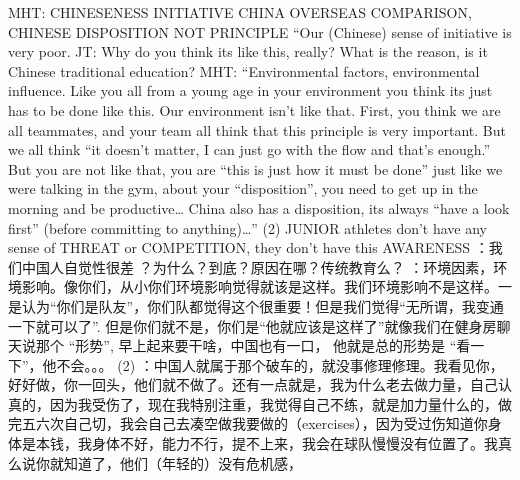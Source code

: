 \begin{CJK}{UTF8}{gbsn}


              MHT:
              CHINESENESS INITIATIVE CHINA OVERSEAS COMPARISON, CHINESE DISPOSITION NOT PRINCIPLE “Our (Chinese) sense of initiative is very poor.  JT: Why do you think its like this, really? What is the reason, is it Chinese traditional education? MHT: “Environmental factors, environmental influence.  Like you all from a young age in your environment you think its just has to be done like this.  Our environment isn’t like that.  First, you think we are all teammates, and your team all think that this principle is very important.  But we all think “it doesn’t matter, I can just go with the flow and that’s enough.” But you are not like that, you are “this is just how it must be done” just like we were talking in the gym, about your “disposition”, you need to get up in the morning and be productive… China also has a disposition, its always “have a look first” (before committing to anything)…” (2) JUNIOR athletes don’t have any sense of THREAT or COMPETITION, they don’t have this AWARENESS	：我们中国人自觉性很差
              ？为什么？到底？原因在哪？传统教育么？
              ：环境因素，环境影响。像你们，从小你们环境影响觉得就该是这样。我们环境影响不是这样。一是认为“你们是队友”，你们队都觉得这个很重要！但是我们觉得“无所谓，我变通一下就可以了”. 但是你们就不是，你们是“他就应该是这样了”就像我们在健身房聊天说那个 “形势”, 早上起来要干啥，中国也有一口， 他就是总的形势是  “看一下”，他不会。。。
              (2) ：中国人就属于那个破车的，就没事修理修理。我看见你，好好做，你一回头，他们就不做了。还有一点就是，我为什么老去做力量，自己认真的，因为我受伤了，现在我特别注重，我觉得自己不练，就是加力量什么的，做完五六次自己切，我会自己去凑空做我要做的（exercises），因为受过伤知道你身体是本钱，我身体不好，能力不行，提不上来，我会在球队慢慢没有位置了。我真么说你就知道了，他们（年轻的）没有危机感，


\end{CJK}
